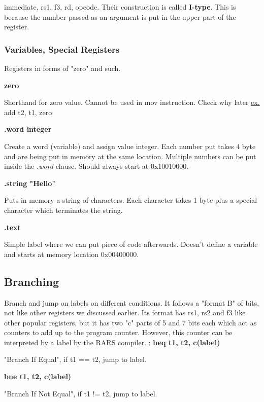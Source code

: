 \documentclass{article}
\begin{document}
    immediate, rs1, f3, rd, opcode. Their construction is called \textbf{I-type}.
    This is because the number passed as an argument is put in the upper part of 
    the register. 

    \subsubsection{Variables, Special Registers}
    Registers in forms of "zero" and such.

    \textbf{zero}
    \par
    Shorthand for zero value. Cannot be used in mov instruction. Check why later
    \underline{ex.} add t2, t1, zero \medbreak

    \textbf{.word integer}
    \par Create a word (variable) and assign value integer. Each number put 
    takes 4 byte and are being put in memory at the same location. Multiple 
    numbers can be put inside the \textit{.word} clause. Should always start
    at 0x10010000.\medbreak

    \textbf{.string "Hello"}
    \par Puts in memory a string of characters. Each character takes 1 byte plus 
    a special character which terminates the string.\medbreak 

    \textbf{.text}
    \par Simple label where we can put piece of code afterwards. Doesn't define 
    a variable and starts at memory location 0x00400000. \medbreak





    \subsection{Branching}
    Branch and jump on labels on different conditions. It follows a "format B" of bits,
    not like other registers we discussed earlier. Its format has rs1, rs2 and f3 like
    other popular registers, but it has two "c" parts of 5 and 7 bits each which act as
    counters to add up to the program counter. However, this counter can be interpreted
    by a label by the RARS compiler. :\medbreak
    \textbf{beq t1, t2, c(label)}
    \par "Branch If Equal", if t1 == t2, jump to label. \medbreak

    \textbf{bne t1, t2, c(label)}
    \par "Branch If Not Equal", if t1 != t2, jump to label. 
\end{document}
